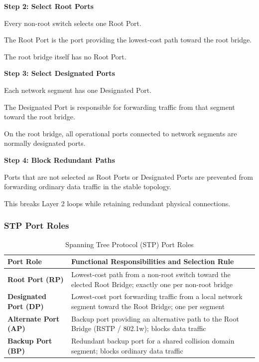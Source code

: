 \textbf{Step 2: Select Root Ports}

Every non-root switch selects one Root Port.

The Root Port is the port providing the lowest-cost path toward the root bridge.

The root bridge itself has no Root Port.

\textbf{Step 3: Select Designated Ports}

Each network segment has one Designated Port.

The Designated Port is responsible for forwarding traffic from that segment toward the root bridge.

On the root bridge, all operational ports connected to network segments are normally designated ports.

\textbf{Step 4: Block Redundant Paths}

Ports that are not selected as Root Ports or Designated Ports are prevented from forwarding ordinary data traffic in the stable topology.

This breaks Layer 2 loops while retaining redundant physical connections.

\subsubsection{STP Port Roles}
\begin{table}[htbp]
\centering
\caption{Spanning Tree Protocol (STP) Port Roles}
\label{tab:stp_port_roles}
\begin{tabularx}{\textwidth}{p{3.5cm} X}
\toprule
\textbf{Port Role} & \textbf{Functional Responsibilities and Selection Rule} \\
\midrule
\textbf{Root Port (RP)} & Lowest-cost path from a non-root switch toward the elected Root Bridge; exactly one per non-root bridge \\
\textbf{Designated Port (DP)} & Lowest-cost port forwarding traffic from a local network segment toward the Root Bridge; one per segment \\
\textbf{Alternate Port (AP)} & Backup port providing an alternative path to the Root Bridge (RSTP / 802.1w); blocks data traffic \\
\textbf{Backup Port (BP)} & Redundant backup port for a shared collision domain segment; blocks ordinary data traffic \\
\bottomrule
\end{tabularx}
\end{table}


